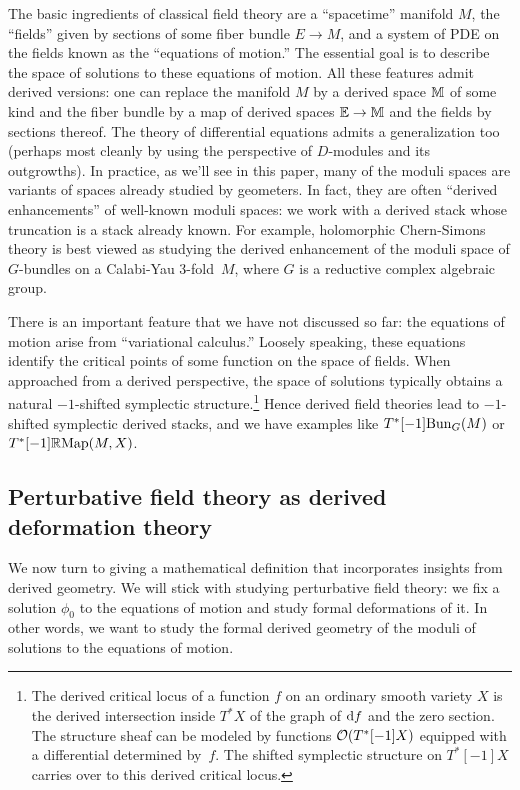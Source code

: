 \documentclass[11pt]{amsart}
\begin{document}
The basic ingredients of classical field theory are a ``spacetime'' manifold $M$, the ``fields'' given by sections of some fiber bundle $E \to M$, and a system of PDE on the fields known as the ``equations of motion.''
The essential goal is to describe the space of solutions to these equations of motion.
All these features admit derived versions: one can replace the manifold $M$ by a derived space $\mathbb M$ of some kind and the fiber bundle by a map of derived spaces $\mathbb E \to \mathbb M$ and the fields by sections thereof.
The theory of differential equations admits a generalization too (perhaps most cleanly by using the perspective of $D$-modules and its outgrowths).
In practice, as we'll see in this paper, many of the moduli spaces are variants of spaces already studied by geometers.
In fact, they are often ``derived enhancements'' of well-known moduli spaces: we work with a derived stack whose truncation is a stack already known.
For example, holomorphic Chern-Simons theory is best viewed as studying the derived enhancement of the moduli space of $G$-bundles on a Calabi-Yau 3-fold~$M$, where $G$ is a reductive complex algebraic group.

There is an important feature that we have not discussed so far:
the equations of motion arise from ``variational calculus.''
Loosely speaking, these equations identify the critical points of some function on the space of fields.
When approached from a derived perspective, 
the space of solutions typically obtains a natural $-1$-shifted symplectic structure.\footnote{The derived critical locus of a function $f$ on an ordinary smooth variety $X$ is the derived intersection inside $T^*X$ of the graph of ${\rm d} f$ and the zero section. The structure sheaf can be modeled by functions $\mathcal O(T^*[-1]X)$ equipped with a differential determined by~$f$. The shifted symplectic structure on $T^*[-1]X$ carries over to this derived critical locus.}
Hence derived field theories lead to $-1$-shifted symplectic derived stacks,
and we have examples like $T^*[-1]{\rm Bun}_G(M)$ or~$T^*[-1] \mathbb R{\rm Map}(M,X)$.

\subsection{Perturbative field theory as derived deformation theory}
\label{sec: pert dfn}

We now turn to giving a mathematical definition that incorporates insights from derived geometry.
We will stick with studying perturbative field theory: 
we fix a solution $\phi_0$ to the equations of motion and study formal deformations of it.
In other words, we want to study the formal derived geometry of the moduli of solutions to the equations of motion.
\end{document}
